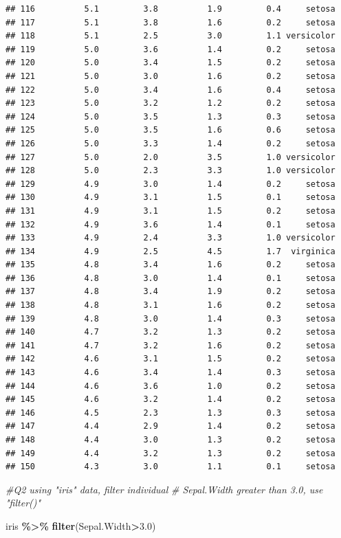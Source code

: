 \documentclass[
]{article}
\newenvironment{Shaded}{\begin{snugshade}}{\end{snugshade}}
\newcommand{\CommentTok}[1]{\textcolor[rgb]{0.56,0.35,0.01}{\textit{#1}}}
\newcommand{\FloatTok}[1]{\textcolor[rgb]{0.00,0.00,0.81}{#1}}
\newcommand{\FunctionTok}[1]{\textcolor[rgb]{0.13,0.29,0.53}{\textbf{#1}}}
\newcommand{\NormalTok}[1]{#1}
\newcommand{\SpecialCharTok}[1]{\textcolor[rgb]{0.81,0.36,0.00}{\textbf{#1}}}
\begin{document}
\begin{verbatim}
## 116          5.1         3.8          1.9         0.4     setosa
## 117          5.1         3.8          1.6         0.2     setosa
## 118          5.1         2.5          3.0         1.1 versicolor
## 119          5.0         3.6          1.4         0.2     setosa
## 120          5.0         3.4          1.5         0.2     setosa
## 121          5.0         3.0          1.6         0.2     setosa
## 122          5.0         3.4          1.6         0.4     setosa
## 123          5.0         3.2          1.2         0.2     setosa
## 124          5.0         3.5          1.3         0.3     setosa
## 125          5.0         3.5          1.6         0.6     setosa
## 126          5.0         3.3          1.4         0.2     setosa
## 127          5.0         2.0          3.5         1.0 versicolor
## 128          5.0         2.3          3.3         1.0 versicolor
## 129          4.9         3.0          1.4         0.2     setosa
## 130          4.9         3.1          1.5         0.1     setosa
## 131          4.9         3.1          1.5         0.2     setosa
## 132          4.9         3.6          1.4         0.1     setosa
## 133          4.9         2.4          3.3         1.0 versicolor
## 134          4.9         2.5          4.5         1.7  virginica
## 135          4.8         3.4          1.6         0.2     setosa
## 136          4.8         3.0          1.4         0.1     setosa
## 137          4.8         3.4          1.9         0.2     setosa
## 138          4.8         3.1          1.6         0.2     setosa
## 139          4.8         3.0          1.4         0.3     setosa
## 140          4.7         3.2          1.3         0.2     setosa
## 141          4.7         3.2          1.6         0.2     setosa
## 142          4.6         3.1          1.5         0.2     setosa
## 143          4.6         3.4          1.4         0.3     setosa
## 144          4.6         3.6          1.0         0.2     setosa
## 145          4.6         3.2          1.4         0.2     setosa
## 146          4.5         2.3          1.3         0.3     setosa
## 147          4.4         2.9          1.4         0.2     setosa
## 148          4.4         3.0          1.3         0.2     setosa
## 149          4.4         3.2          1.3         0.2     setosa
## 150          4.3         3.0          1.1         0.1     setosa
\end{verbatim}

\begin{Shaded}
\begin{Highlighting}[]
\CommentTok{\#Q2 using "iris" data, filter individual}
\CommentTok{\# Sepal.Width greater than 3.0, use "filter()"}

\NormalTok{iris }\SpecialCharTok{\%\textgreater{}\%} 
  \FunctionTok{filter}\NormalTok{(Sepal.Width}\SpecialCharTok{\textgreater{}}\FloatTok{3.0}\NormalTok{)}
\end{Highlighting}
\end{Shaded}
\end{document}
